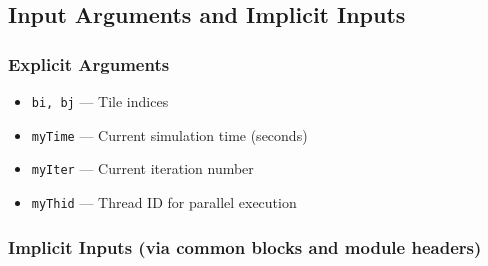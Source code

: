 \documentclass[11pt, a4paper]{article}
\begin{document}
\subsection{Input Arguments and Implicit Inputs}

\subsubsection{Explicit Arguments}

\begin{itemize}
    \item \texttt{bi, bj} — Tile indices
    \item \texttt{myTime} — Current simulation time (seconds)
    \item \texttt{myIter} — Current iteration number
    \item \texttt{myThid} — Thread ID for parallel execution
\end{itemize}

\subsubsection{Implicit Inputs (via common blocks and module headers)}
\end{document}
